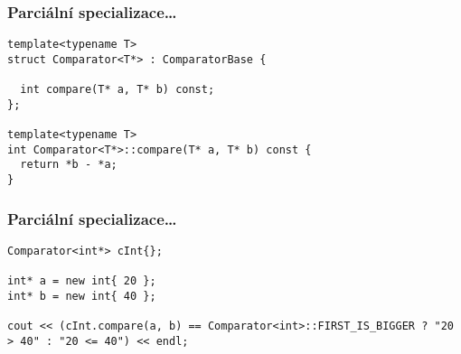 \begin{frame}[fragile]
\frametitle{Parciální specializace\ldots}
\begin{yesblock}
\begin{lstlisting}
template<typename T>
struct Comparator<T*> : ComparatorBase {

  int compare(T* a, T* b) const;
};

template<typename T>
int Comparator<T*>::compare(T* a, T* b) const {
  return *b - *a;
}
\end{lstlisting}
\end{yesblock}
\end{frame}

\begin{frame}[fragile]
\frametitle{Parciální specializace\ldots}
\begin{yesblock}
\begin{lstlisting}
Comparator<int*> cInt{};

int* a = new int{ 20 };
int* b = new int{ 40 };

cout << (cInt.compare(a, b) == Comparator<int>::FIRST_IS_BIGGER ? "20 > 40" : "20 <= 40") << endl;
\end{lstlisting}
\end{yesblock}
\end{frame}

\zkouskove